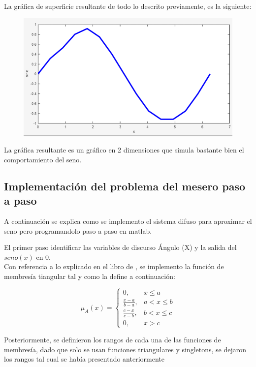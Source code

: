 \documentclass[11pt, letterpaper]{article}
\begin{document}
La gráfica de superficie resultante de todo lo descrito previamente, es la siguiente:

\begin{figure}[h]
	\centering
	\includegraphics[width=1\textwidth]{IMG/P14.png}
\end{figure}

La gráfica resultante es un gráfico en 2 dimensiones que simula bastante bien el comportamiento del seno.

\newpage

\subsection{Implementación del problema del mesero paso a paso}

A continuación se explica como se implemento el sistema difuso para aproximar el seno pero programandolo paso a paso en matlab.

El primer paso  identificar las variables de discurso Ángulo (X) y la salida del $seno(x)$ en 0.\\

Con referencia a lo explicado en el libro de \cite{Cisneros2004}, se implemento la función de membresía tiangular tal y como la define a continuación:

$$
\mu_A(x) = 
\begin{cases}
	0, & x \le a \\
	\frac{x - a}{b - a}, & a < x \le b \\
	\frac{c - x}{c - b}, & b < x \le c \\
	0, & x > c
\end{cases}
$$


Posteriormente, se definieron los rangos de cada una de las funciones de membresía, dado que solo se usan funciones triangulares y singletons, se dejaron los rangos tal cual se había presentado anteriormente
\end{document}
